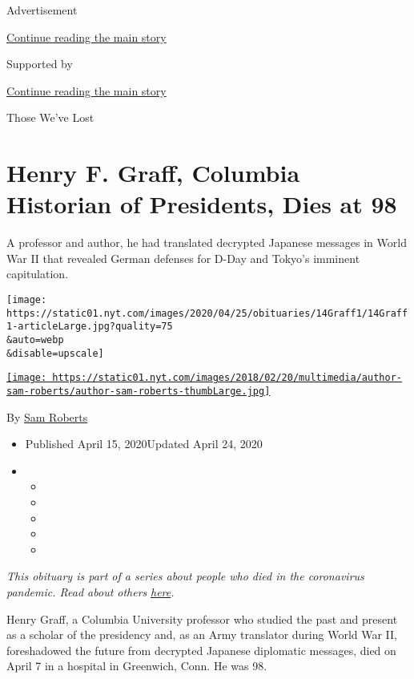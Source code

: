 Advertisement

\protect\hyperlink{after-top}{Continue reading the main story}

Supported by

\protect\hyperlink{after-sponsor}{Continue reading the main story}

Those We've Lost

\hypertarget{henry-f-graff-columbia-historian-of-presidents-dies-at-98}{%
\section{Henry F. Graff, Columbia Historian of Presidents, Dies at
98}\label{henry-f-graff-columbia-historian-of-presidents-dies-at-98}}

A professor and author, he had translated decrypted Japanese messages in
World War II that revealed German defenses for D-Day and Tokyo's
imminent capitulation.

\texttt{[image: https://static01.nyt.com/images/2020/04/25/obituaries/14Graff1/14Graff1-articleLarge.jpg?quality=75\\\&auto=webp\\\&disable=upscale]}

\href{https://www.nytimes.com/by/sam-roberts}{\texttt{[image: https://static01.nyt.com/images/2018/02/20/multimedia/author-sam-roberts/author-sam-roberts-thumbLarge.jpg]}}

By \href{https://www.nytimes.com/by/sam-roberts}{Sam Roberts}

\begin{itemize}
\item
  Published April 15, 2020Updated April 24, 2020
\item
  \begin{itemize}
  \item
  \item
  \item
  \item
  \item
  \end{itemize}
\end{itemize}

\emph{This obituary is part of a series about people who died in the
coronavirus pandemic. Read about others}
\href{https://www.nytimes.com/series/people-who-have-died-of-the-coronavirus}{\emph{here}}\emph{.}

Henry Graff, a Columbia University professor who studied the past and
present as a scholar of the presidency and, as an Army translator during
World War II, foreshadowed the future from decrypted Japanese diplomatic
messages, died on April 7 in a hospital in Greenwich, Conn. He was 98.

